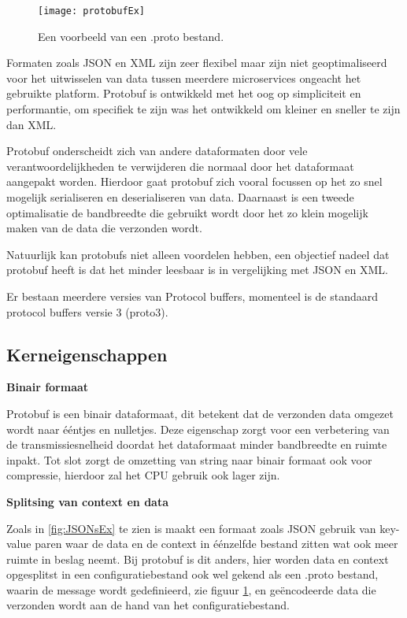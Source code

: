 \begin{figure}[H]
    \centering
    \texttt{[image: protobufEx]}
    \caption[Protocol Buffer .proto bestand]{Een voorbeeld van een .proto bestand.  \autocite{Kurian2020}}
    \label{fig:protobufEx}
\end{figure}

Formaten zoals JSON en XML zijn zeer flexibel maar zijn niet geoptimaliseerd voor het uitwisselen van data tussen meerdere microservices \autocite{Fowler2014} ongeacht het gebruikte platform. Protobuf is ontwikkeld met het oog op simpliciteit en performantie, om specifiek te zijn was het ontwikkeld om kleiner en sneller te zijn dan XML.

Protobuf onderscheidt zich van andere dataformaten door vele verantwoordelijkheden te verwijderen die normaal door het dataformaat aangepakt worden. Hierdoor gaat protobuf zich vooral focussen op het zo snel mogelijk serialiseren en deserialiseren van data. Daarnaast is een tweede optimalisatie de bandbreedte die gebruikt wordt door het zo klein mogelijk maken van de data die verzonden wordt.

Natuurlijk kan protobufs niet alleen voordelen hebben, een objectief nadeel dat protobuf heeft is dat het minder leesbaar is in vergelijking met JSON en XML.

Er bestaan meerdere versies van Protocol buffers, momenteel is de standaard protocol buffers versie 3 (proto3).


\subsection{Kerneigenschappen}
\label{subsec:Kerneigenschappen}

\textbf{Binair formaat}

Protobuf is een binair dataformaat, dit betekent dat de verzonden data omgezet wordt naar ééntjes en nulletjes. Deze eigenschap zorgt voor een verbetering van de transmissiesnelheid doordat het dataformaat minder bandbreedte en ruimte inpakt. Tot slot zorgt de omzetting van string naar binair formaat ook voor compressie, hierdoor zal het CPU gebruik ook lager zijn.

\textbf{Splitsing van context en data}

Zoals in \ref{fig:JSONsEx} te zien is maakt een formaat zoals JSON gebruik van key-value paren waar de data en de context in éénzelfde bestand zitten wat ook meer ruimte in beslag neemt. Bij protobuf is dit anders, hier worden data en context opgesplitst in een configuratiebestand ook wel gekend als een .proto bestand, waarin de message wordt gedefinieerd, zie figuur \ref{fig:protobufEx}, en geëncodeerde data die verzonden wordt aan de hand van het configuratiebestand.

